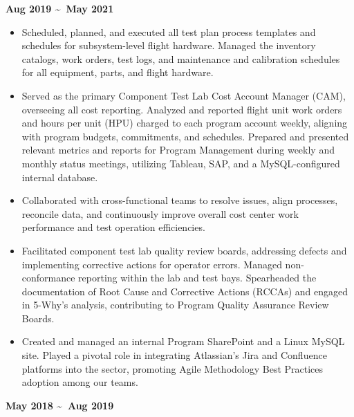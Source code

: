 \documentclass[AutoFakeBold]{resume}
\begin{document}
\vspace{.5mm}
 {\textbf{Aug 2019 \textasciitilde \ May 2021}}
\begin{itemize}
    \item Scheduled, planned, and executed all test plan process templates and schedules for subsystem-level flight hardware. Managed the inventory catalogs, work orders, test logs, and maintenance and calibration schedules for all equipment, parts, and flight hardware.
    \item Served as the primary Component Test Lab Cost Account Manager (CAM), overseeing all cost reporting. Analyzed and reported flight unit work orders and hours per unit (HPU) charged to each program account weekly, aligning with program budgets, commitments, and schedules. Prepared and presented relevant metrics and reports for Program Management during weekly and monthly status meetings, utilizing Tableau, SAP, and a MySQL-configured internal database.
    \item Collaborated with cross-functional teams to resolve issues, align processes, reconcile data, and continuously improve overall cost center work performance and test operation efficiencies.
    \item Facilitated component test lab quality review boards, addressing defects and implementing corrective actions for operator errors. Managed non-conformance reporting within the lab and test bays. Spearheaded the documentation of Root Cause and Corrective Actions (RCCAs) and engaged in 5-Why's analysis, contributing to Program Quality Assurance Review Boards.
    \item Created and managed an internal Program SharePoint and a Linux MySQL site. Played a pivotal role in integrating Atlassian's Jira and Confluence platforms into the sector, promoting Agile Methodology Best Practices adoption among our teams.
\end{itemize}
 {\textbf{May 2018 \textasciitilde \ Aug 2019}}
\end{document}

